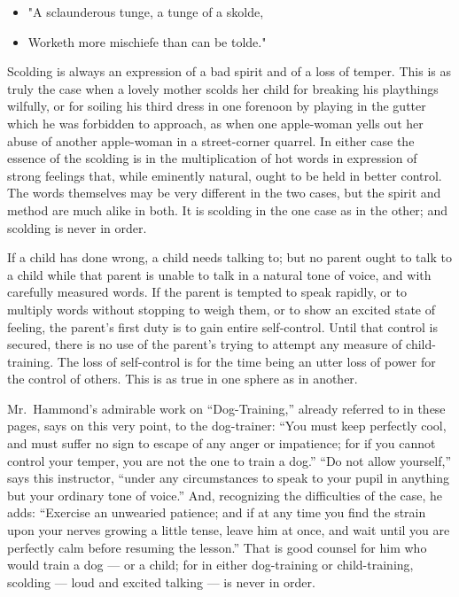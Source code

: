 \documentclass[
]{book}
\providecommand{\tightlist}{%
  \setlength{\itemsep}{0pt}\setlength{\parskip}{0pt}}
\begin{document}
\begin{itemize}
\tightlist
\item
  "A sclaunderous tunge, a tunge of a skolde,
\item
  Worketh more mischiefe than can be tolde."
\end{itemize}

Scolding is always an expression of a bad spirit and of a loss of temper. This is as truly the case when a lovely mother scolds her child for breaking his playthings wilfully, or for soiling his third dress in one forenoon by playing in the gutter which he was forbidden to approach, as when one apple-woman yells out her abuse of another apple-woman in a street-corner quarrel. In either case the essence of the scolding is in the multiplication of hot words in expression of strong feelings that, while eminently natural, ought to be held in better control. The words themselves may be very different in the two cases, but the spirit and method are much alike in both. It is scolding in the one case as in the other; and scolding is never in order.

If a child has done wrong, a child needs talking to; but no parent ought to talk to a child while that parent is unable to talk in a natural tone of voice, and with carefully measured words. If the parent is tempted to speak rapidly, or to multiply words without stopping to weigh them, or to show an excited state of feeling, the parent's first duty is to gain entire self-control. Until that control is secured, there is no use of the parent's trying to attempt any measure of child-training. The loss of self-control is for the time being an utter loss of power for the control of others. This is as true in one sphere as in another.

Mr.~Hammond's admirable work on ``Dog-Training,'' already referred to in these pages, says on this very point, to the dog-trainer: ``You must keep perfectly cool, and must suffer no sign to escape of any anger or impatience; for if you cannot control your temper, you are not the one to train a dog.'' ``Do not allow yourself,'' says this instructor, ``under any circumstances to speak to your pupil in anything but your ordinary tone of voice.'' And, recognizing the difficulties of the case, he adds: ``Exercise an unwearied patience; and if at any time you find the strain upon your nerves growing a little tense, leave him at once, and wait until you are perfectly calm before resuming the lesson.'' That is good counsel for him who would train a dog --- or a child; for in either dog-training or child-training, scolding --- loud and excited talking --- is never in order.
\end{document}
